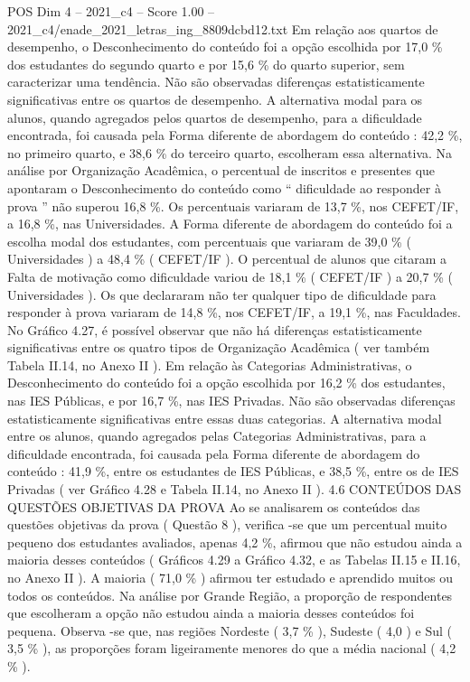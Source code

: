 \begin{textsample}{POS Dim 4 – 2021\_c4 – Score 1.00 – 2021\_c4/enade\_2021\_letras\_ing\_8809dcbd12.txt}
Em relação aos quartos de desempenho, o Desconhecimento do conteúdo foi a opção escolhida por 17,0 \% dos estudantes do segundo quarto e por 15,6 \% do quarto superior, sem caracterizar uma tendência.
Não são observadas diferenças estatisticamente significativas entre os quartos de desempenho.
A alternativa modal para os alunos, quando agregados pelos quartos de desempenho, para a dificuldade encontrada, foi causada pela Forma diferente de abordagem do conteúdo : 42,2 \%, no primeiro quarto, e 38,6 \% do terceiro quarto, escolheram essa alternativa.
Na análise por Organização Acadêmica, o percentual de inscritos e presentes que apontaram o Desconhecimento do conteúdo como “ dificuldade ao responder à prova ” não superou 16,8 \%.
Os percentuais variaram de 13,7 \%, nos CEFET/IF, a 16,8 \%, nas Universidades.
A Forma diferente de abordagem do conteúdo foi a escolha modal dos estudantes, com percentuais que variaram de 39,0 \% ( Universidades ) a 48,4 \% ( CEFET/IF ).
O percentual de alunos que citaram a Falta de motivação como dificuldade variou de 18,1 \% ( CEFET/IF ) a 20,7 \% ( Universidades ).
Os que declararam não ter qualquer tipo de dificuldade para responder à prova variaram de 14,8 \%, nos CEFET/IF, a 19,1 \%, nas Faculdades.
No Gráfico 4.27, é possível observar que não há diferenças estatisticamente significativas entre os quatro tipos de Organização Acadêmica ( ver também Tabela II.14, no Anexo II ).
Em relação às Categorias Administrativas, o Desconhecimento do conteúdo foi a opção escolhida por 16,2 \% dos estudantes, nas IES Públicas, e por 16,7 \%, nas IES Privadas.
Não são observadas diferenças estatisticamente significativas entre essas duas categorias.
A alternativa modal entre os alunos, quando agregados pelas Categorias Administrativas, para a dificuldade encontrada, foi causada pela Forma diferente de abordagem do conteúdo : 41,9 \%, entre os estudantes de IES Públicas, e 38,5 \%, entre os de IES Privadas ( ver Gráfico 4.28 e Tabela II.14, no Anexo II ). 4.6 CONTEÚDOS DAS QUESTÕES OBJETIVAS DA PROVA Ao se analisarem os conteúdos das questões objetivas da prova ( Questão 8 ), verifica -se que um percentual muito pequeno dos estudantes avaliados, apenas 4,2 \%, afirmou que não estudou ainda a maioria desses conteúdos ( Gráficos 4.29 a Gráfico 4.32, e as Tabelas II.15 e II.16, no Anexo II ).
A maioria ( 71,0 \% ) afirmou ter estudado e aprendido muitos ou todos os conteúdos.
Na análise por Grande Região, a proporção de respondentes que escolheram a opção não estudou ainda a maioria desses conteúdos foi pequena.
Observa -se que, nas regiões Nordeste ( 3,7 \% ), Sudeste ( 4,0 ) e Sul ( 3,5 \% ), as proporções foram ligeiramente menores do que a média nacional ( 4,2 \% ).

\end{textsample}
